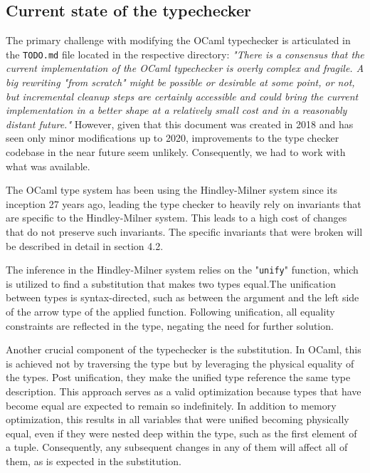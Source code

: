 \documentclass[a4paper,11pt,oneside]{article}
\theoremstyle{definition}
\begin{document}
\subsection{Current state of the typechecker}

The primary challenge with modifying the OCaml typechecker is articulated in the \texttt{TODO.md} file located in the respective directory:
{\itshape
"There is a consensus that the current implementation of the OCaml typechecker is overly complex and fragile. A big rewriting "from scratch" might be possible or desirable at some point, or not, but incremental cleanup steps are certainly accessible and could bring the current implementation in a better shape at a relatively small cost and in a reasonably distant future."
}
However, given that this document was created in 2018 and has seen only minor modifications up to 2020, improvements to the type checker codebase in the near future seem unlikely. Consequently, we had to work with what was available.

The OCaml type system has been using the Hindley-Milner \cite{Hindley_1969} \cite{Milner_1978} system since its inception 27 years ago, leading the type checker to heavily rely on invariants that are specific to the Hindley-Milner system.
This leads to a high cost of changes that do not preserve such invariants.
The specific invariants that were broken will be described in detail in section 4.2.

The inference in the Hindley-Milner system relies on the "\texttt{unify}" function, which is utilized to find a substitution that makes two types equal.The unification between types is syntax-directed, such as between the argument and the left side of the arrow type of the applied function. Following unification, all equality constraints are reflected in the type, negating the need for further solution.

Another crucial component of the typechecker is the substitution. In OCaml, this is achieved not by traversing the type but by leveraging the physical equality of the types. Post unification, they make the unified type reference the same type description. This approach serves as a valid optimization because types that have become equal are expected to remain so indefinitely. In addition to memory optimization, this results in all variables that were unified becoming physically equal, even if they were nested deep within the type, such as the first element of a tuple. Consequently, any subsequent changes in any of them will affect all of them, as is expected in the substitution.
\end{document}
